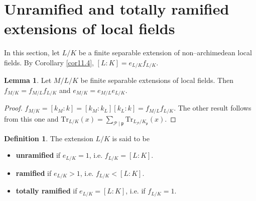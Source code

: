 \documentclass{article}
\theoremstyle{definition}
\newtheorem{lemma}[theorem]{Lemma}
\newtheorem{defn}{Definition}[section]
\begin{document}
\section{Unramified and totally ramified extensions of local fields}
In this section, let $L/K$ be a finite separable extension of non--archimedean local fields. By Corollary \ref{cor11.4}, $[L:K] = e_{L/K}f_{L/K}$.
\begin{lemma}
    Let $M/L/K$ be finite separable extensions of local fields. Then $f_{M/K} = f_{M/L}f_{L/K}$ and $e_{M/K} = e_{M/L}e_{L/K}$.
\end{lemma}
\begin{proof}
    $f_{M/K} = [k_M:k] = [k_M : k_L][k_L : k]= f_{M/L}f_{L/K}$. The other result follows from this one and $\text{Tr}_{L/K}(x) = \sum_{\mathcal{P}\mid  \mathfrak{p}}^{} \text{Tr}_{L_\mathcal{P}/K_\mathfrak{p}}(x)$.
\end{proof}
\begin{defn}
    The extension $L/K$ is said to be 
    \begin{itemize}
        \item \textbf{unramified} if $e_{L/K} = 1$, i.e. $f_{L/K}=[L:K]$.
        \item \textbf{ramified} if $e_{L/K}>1$, i.e. $f_{L/K}< [L:K]$.
        \item \textbf{totally ramified} if $e_{L/K} = [L:K]$, i.e. if $f_{L/K}=1$.
    \end{itemize}
\end{defn}

\end{document}
